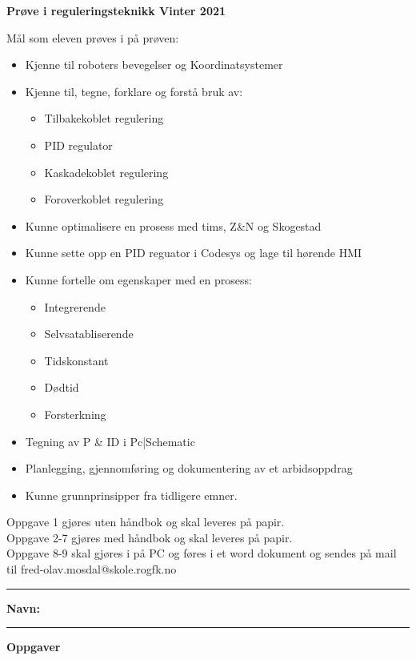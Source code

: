 \documentclass[12pt,a4paper]{article}
\begin{document}
\LARGE
\centerline{\bf Prøve i reguleringsteknikk Vinter 2021}  \bigskip
\normalsize
Mål som eleven prøves i på prøven: 
\begin{itemize}[noitemsep]
\item Kjenne til roboters bevegelser og Koordinatsystemer 
\item Kjenne til, tegne, forklare og forstå bruk av: 
\begin{itemize}[noitemsep]
	\item Tilbakekoblet regulering 
	\item PID regulator 
	\item Kaskadekoblet regulering 
	\item Foroverkoblet regulering 
\end{itemize}
\item Kunne optimalisere en prosess med tims, Z\&N og Skogestad 
\item Kunne sette opp en PID reguator i Codesys og lage til hørende HMI 
\item Kunne fortelle om egenskaper med en prosess: 
\begin{itemize}[noitemsep]
	\item Integrerende 
	\item Selvsatabliserende 
	\item Tidskonstant 
	\item Dødtid 
	\item Forsterkning 
\end{itemize}
\item Tegning av P \& ID i Pc|Schematic 
\item Planlegging, gjennomføring og dokumentering av et arbidsoppdrag
\item Kunne grunnprinsipper fra tidligere emner. 
\end{itemize}



Oppgave 1 gjøres uten håndbok og skal leveres på papir. \\
Oppgave 2-7 gjøres med håndbok og skal leveres på papir. \\
Oppgave 8-9 skal gjøres i på PC og føres i et word  dokument og sendes på mail til fred-olav.mosdal@skole.rogfk.no\\

\bigskip 
\hrule
\bigskip 
\textbf{Navn:}\bigskip 
\hrule
\vfil \eject
\centerline{\bf Oppgaver}
\end{document}
